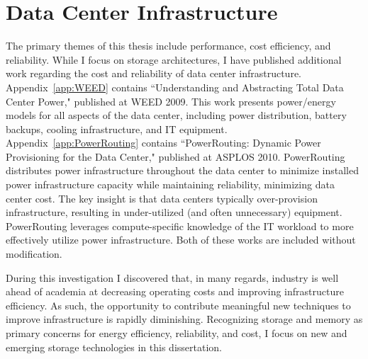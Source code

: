 \section{Data Center Infrastructure}
\label{sec:Intro:Additional}
The primary themes of this thesis include performance, cost efficiency, and reliability.
While I focus on storage architectures, I have published additional work regarding the cost and reliability of data center infrastructure.
Appendix~\ref{app:WEED} contains ``Understanding and Abstracting Total Data Center Power," \cite{PelleyMeisner09} published at WEED 2009.
This work presents power/energy models for all aspects of the data center, including power distribution, battery backups, cooling infrastructure, and IT equipment.
Appendix~\ref{app:PowerRouting} contains ``PowerRouting: Dynamic Power Provisioning for the Data Center," \cite{PelleyMeisner10} published at ASPLOS 2010.
PowerRouting distributes power infrastructure throughout the data center to minimize installed power infrastructure capacity while maintaining reliability, minimizing data center cost.
The key insight is that data centers typically over-provision infrastructure, resulting in under-utilized (and often unnecessary) equipment.
PowerRouting leverages compute-specific knowledge of the IT workload to more effectively utilize power infrastructure.
Both of these works are included without modification.

During this investigation I discovered that, in many regards, industry is well ahead of academia at decreasing operating costs and improving infrastructure efficiency.
As such, the opportunity to contribute meaningful new techniques to improve infrastructure is rapidly diminishing.
Recognizing storage and memory as primary concerns for energy efficiency, reliability, and cost, I focus on new and emerging storage technologies in this dissertation.

